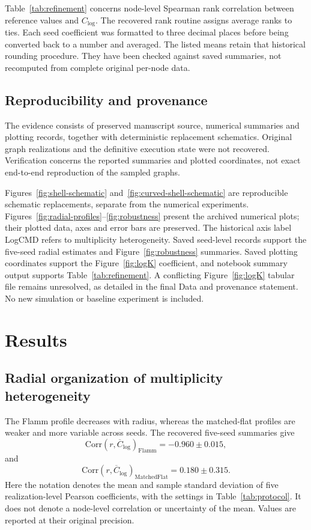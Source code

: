 \documentclass[11pt,a4paper]{article}
\begin{document}
Table~\ref{tab:refinement} concerns node-level Spearman rank correlation between reference values and $C_{\log}$. The recovered rank routine assigns average ranks to ties. Each seed coefficient was formatted to three decimal places before being converted back to a number and averaged. The listed means retain that historical rounding procedure. They have been checked against saved summaries, not recomputed from complete original per-node data.

\subsection{Reproducibility and provenance}
\label{sec:provenance}
The evidence consists of preserved manuscript source, numerical summaries and plotting records, together with deterministic replacement schematics. Original graph realizations and the definitive execution state were not recovered. Verification concerns the reported summaries and plotted coordinates, not exact end-to-end reproduction of the sampled graphs.

Figures~\ref{fig:shell-schematic} and~\ref{fig:curved-shell-schematic} are reproducible schematic replacements, separate from the numerical experiments. Figures~\ref{fig:radial-profiles}--\ref{fig:robustness} present the archived numerical plots; their plotted data, axes and error bars are preserved. The historical axis label LogCMD refers to multiplicity heterogeneity. Saved seed-level records support the five-seed radial estimates and Figure~\ref{fig:robustness} summaries. Saved plotting coordinates support the Figure~\ref{fig:logK} coefficient, and notebook summary output supports Table~\ref{tab:refinement}. A conflicting Figure~\ref{fig:logK} tabular file remains unresolved, as detailed in the final Data and provenance statement. No new simulation or baseline experiment is included.

\section{Results}
\subsection{Radial organization of multiplicity heterogeneity}
The Flamm profile decreases with radius, whereas the matched-flat profiles are weaker and more variable across seeds. The recovered five-seed summaries give
\begin{equation}
\mathrm{Corr}(r,\overline{C}_{\log})_{\mathrm{Flamm}}=-0.960\pm 0.015,
\end{equation}
and
\begin{equation}
\mathrm{Corr}(r,\overline{C}_{\log})_{\mathrm{MatchedFlat}}=0.180\pm 0.315.
\end{equation}
Here the notation denotes the mean and sample standard deviation of five realization-level Pearson coefficients, with the settings in Table~\ref{tab:protocol}. It does not denote a node-level correlation or uncertainty of the mean. Values are reported at their original precision.
\end{document}
